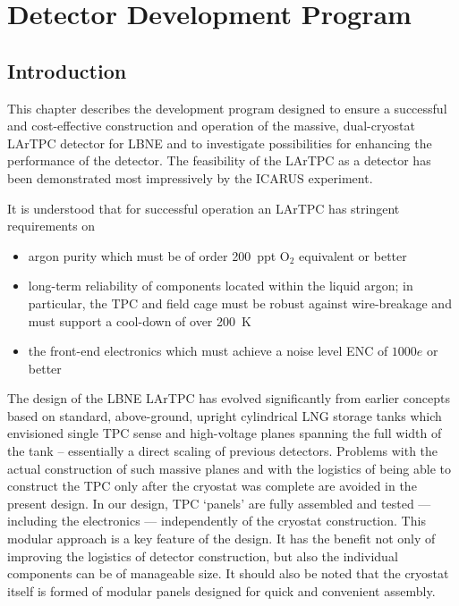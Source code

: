 %
%
\chapter{Detector Development Program}
\label{ch:randd}


\section{Introduction}
This chapter describes the development program designed to ensure a successful and cost-effective construction and operation of the massive, dual-cryostat LArTPC detector for LBNE and to investigate possibilities for enhancing the performance of the detector. The feasibility of the LArTPC as a detector has been demonstrated most impressively by the  ICARUS experiment.

It is understood that for successful operation an LArTPC has stringent requirements on
\begin{itemize}
 \item argon purity which must be of order 200~ppt O$_2$ equivalent or better
 \item long-term reliability of components located within the liquid argon; in particular, the TPC and field cage must be robust against wire-breakage and must support a cool-down of over 200~K
 \item the front-end electronics which must achieve a noise level ENC of $1000 e$ or better
\end{itemize}

The design of the LBNE LArTPC has evolved significantly from earlier concepts based on standard, above-ground, upright cylindrical LNG storage tanks which envisioned single TPC sense and high-voltage planes spanning the full width of the tank -- essentially a direct scaling of previous detectors. Problems with the actual construction of such massive planes and with the logistics of being able to construct the TPC only after the cryostat was complete are avoided in the present design. In our design,  TPC `panels'  are fully assembled and tested  --- including the electronics ---  independently of the cryostat construction. This modular approach is a key feature of the design. It has the benefit not only of improving the logistics of detector construction, but also the individual components can be of manageable size. It should also be noted that the cryostat itself is formed of modular panels designed for quick and convenient assembly.

